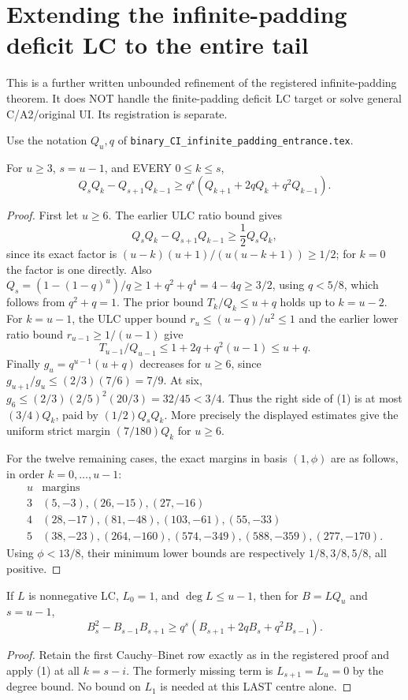 \section{Extending the infinite-padding deficit LC to the entire tail}
This is a further written unbounded refinement of the registered
infinite-padding theorem. It does NOT handle the finite-padding deficit
LC target or solve general C/A2/original UI. Its registration is separate.

Use the notation $Q_u,q$ of
\texttt{binary\_CI\_infinite\_padding\_entrance.tex}.

\begin{lemma}
For $u\ge3$, $s=u-1$, and EVERY $0\le k\le s$,
\[
 Q_sQ_k-Q_{s+1}Q_{k-1}
       \ge q^s(Q_{k+1}+2qQ_k+q^2Q_{k-1}).             \tag{1}
\]
\end{lemma}
\begin{proof}
First let $u\ge6$. The earlier ULC ratio bound gives
\[
 Q_sQ_k-Q_{s+1}Q_{k-1}\ge\frac12 Q_sQ_k,
\]
since its exact factor is $(u-k)(u+1)/(u(u-k+1))\ge1/2$;
for $k=0$ the factor is one directly.
Also $Q_s=(1-(1-q)^u)/q\ge1+q^2+q^4=4-4q\ge3/2$,
using $q<5/8$, which follows from $q^2+q=1$.
The prior bound $T_k/Q_k\le u+q$ holds up to $k=u-2$.
For $k=u-1$, the ULC upper bound $r_u\le(u-q)/u^2\le1$
and the earlier lower ratio bound $r_{u-1}\ge1/(u-1)$ give
\[
 T_{u-1}/Q_{u-1}\le1+2q+q^2(u-1)\le u+q.
\]
Finally $g_u=q^{u-1}(u+q)$ decreases for $u\ge6$, since
$g_{u+1}/g_u\le(2/3)(7/6)=7/9$. At six,
$g_6\le(2/3)(2/5)^2(20/3)=32/45<3/4$.
Thus the right side of (1) is at most $(3/4)Q_k$, paid by
$(1/2)Q_sQ_k$.
More precisely the displayed estimates give the uniform strict margin
$(7/180)Q_k$ for $u\ge6$.

For the twelve remaining cases, the exact margins in basis $(1,\phi)$
are as follows, in order $k=0,\ldots,u-1$:
\[
\begin{array}{c|l}
u&\text{margins}\\\hline
3&(5,-3),(26,-15),(27,-16)\\
4&(28,-17),(81,-48),(103,-61),(55,-33)\\
5&(38,-23),(264,-160),(574,-349),(588,-359),(277,-170).
\end{array}
\]
Using $\phi<13/8$, their minimum lower bounds are respectively
$1/8,3/8,5/8$, all positive.
\end{proof}

\begin{corollary}
If $L$ is nonnegative LC, $L_0=1$, and $\deg L\le u-1$, then
for $B=LQ_u$ and $s=u-1$,
\[
 B_s^2-B_{s-1}B_{s+1}\ge q^s(B_{s+1}+2qB_s+q^2B_{s-1}).
                                                               \tag{2}
\]
\end{corollary}
\begin{proof}
Retain the first Cauchy--Binet row exactly as in the registered
proof and apply (1) at all $k=s-i$. The formerly missing term is
$L_{s+1}=L_u=0$ by the degree bound. No bound on $L_1$ is needed
at this LAST centre alone.
\end{proof}

